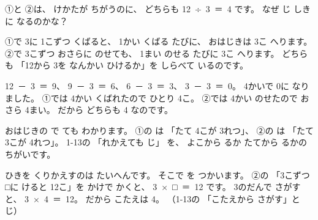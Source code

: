 \noindent ①と ②は、 けかたが ちがうのに、 どちらも \mbox{12 ÷ 3 ＝ 4} です。 なぜ じ しきに なるのかな？


\label{bk:1-14:onaji}①で 3に 1こずつ くばると、 1かい くばる たびに、 おはじきは 3こ へります。 ②で 3こずつ おさらに のせても、 1まい のせる たびに 3こ へります。 どちらも 「12から 3を なんかい ひけるか」を しらべて いるのです。
\begin{bkfigure}
\end{bkfigure}
\noindent \mbox{12 － 3 ＝ 9}、 \mbox{9 － 3 ＝ 6}、 \mbox{6 － 3 ＝ 3}、 \mbox{3 － 3 ＝ 0}。 4かいで 0に なりました。 ①では 4かい くばれたので ひとり 4こ。 ②では 4かい のせたので おさら 4まい。 だから どちらも 4 なのです。

\noindent おはじきの で ても わかります。 ①の は 「たて 4こが 3れつ」、 ②の は 「たて 3こが 4れつ」。 1-13の 「れかえても じ」 を、 よこから るか たてから るかの ちがいです。


\label{bk:1-14:kuku}ひきを くりかえすのは たいへんです。 そこで を つかいます。 ②の 「3こずつ \mbox{□}に けると 12こ」を かけで かくと、 \mbox{3 × □ ＝ 12} です。 3のだんで さがすと、 \mbox{3 × 4 ＝ 12}。 だから こたえは 4。 （1-13の 「こたえから さがす」と じ）

